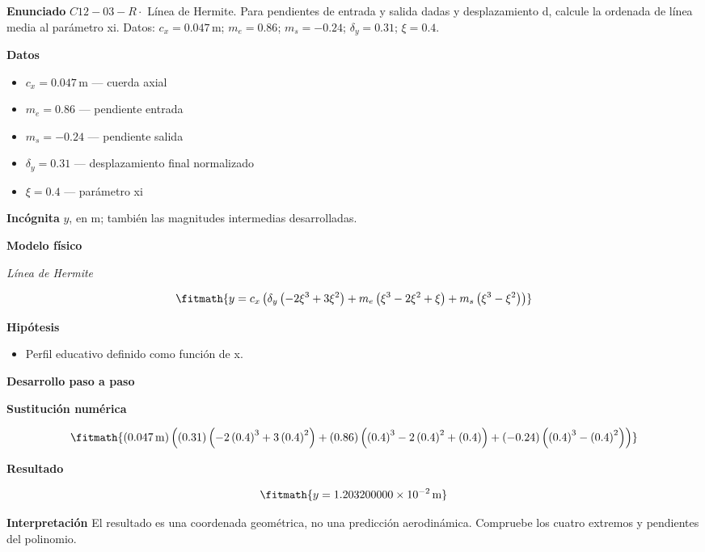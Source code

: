 \documentclass[10pt,openany]{book}
\begin{document}
\begin{tcolorbox}[title={Problema resuelto 3}, studiumworked, breakable]

\noindent\textbf{Enunciado}
\(C12-03-R \cdot\) Línea de Hermite. Para pendientes de entrada y salida dadas y desplazamiento d, calcule la ordenada de línea media al parámetro xi. Datos: \(c_x=0.047\, \mathrm{m}\); \(m_e=0.86\); \(m_s=-0.24\); \(\delta_y=0.31\); \(\xi=0.4\).

\noindent\textbf{Datos}
\begin{itemize}
\item $c_x = 0.047\,\mathrm{m}$ — cuerda axial
\item $m_e = 0.86$ — pendiente entrada
\item $m_s = -0.24$ — pendiente salida
\item $\delta_y = 0.31$ — desplazamiento final normalizado
\item $\xi = 0.4$ — parámetro xi
\end{itemize}

\noindent\textbf{Incógnita}
$y$, en $\mathrm{m}$; también las magnitudes intermedias desarrolladas.

\noindent\textbf{Modelo físico}

\noindent\textit{Línea de Hermite}

\[
\fitmath{y=c_x \left(\delta_y \left(- 2 \xi^{3} + 3 \xi^{2}\right) + m_e \left(\xi^{3} - 2 \xi^{2} + \xi\right) + m_s \left(\xi^{3} - \xi^{2}\right)\right)}
\]

\noindent\textbf{Hipótesis}
\begin{itemize}
\item Perfil educativo definido como función de x.
\end{itemize}

\noindent\textbf{Desarrollo paso a paso}



\noindent\textbf{Sustitución numérica}

\[
\fitmath{\left(0.047\,\mathrm{m}\right) \left(\left(0.31\right) \left(- 2 \left(0.4\right)^{3} + 3 \left(0.4\right)^{2}\right) + \left(0.86\right) \left(\left(0.4\right)^{3} - 2 \left(0.4\right)^{2} + \left(0.4\right)\right) + \left(-0.24\right) \left(\left(0.4\right)^{3} - \left(0.4\right)^{2}\right)\right)}
\]

\noindent\textbf{Resultado}

\[
\fitmath{y=1.203200000\times10^{-2}\,\mathrm{m}}
\]

\noindent\textbf{Interpretación}
El resultado es una coordenada geométrica, no una predicción aerodinámica. Compruebe los cuatro extremos y pendientes del polinomio.


\end{tcolorbox}
\end{document}
